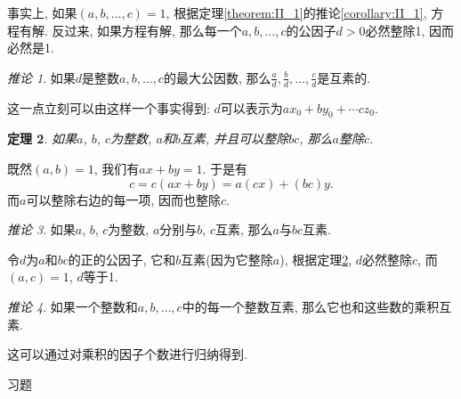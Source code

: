 \documentclass[12pt,a4paper]{book} %
\newtheorem{theorem}{定理}
\theoremstyle{remark}
\theoremstyle{example}
\theoremstyle{lemma}
\theoremstyle{corollary}
\newtheorem{corollary}[theorem]{推论}
\numberwithin{theorem}{chapter}
\begin{document}
事实上, 如果$(a, b, \ldots, c) = 1$, 根据定理\ref{theorem:II_1}的推论\ref{corollary:II_1}, 方程有解. 反过来, 如果方程有解, 那么每一个$a, b, \ldots, c$的公因子$d > 0$必然整除1, 因而必然是1.

\begin{corollary}
如果$d$是整数$a, b, \ldots, c$的最大公因数, 那么$\frac{a}{d}, \frac{b}{d}, \ldots, \frac{c}{d}$是互素的.
\end{corollary}

这一点立刻可以由这样一个事实得到: $d$可以表示为$ax_0 + by_0 + \cdots cz_0$.

\begin{theorem} \label{theorem:III_2}
如果$a$, $b$, $c$为整数, $a$和$b$互素, 并且可以整除$bc$, 那么$a$整除$c$.
\end{theorem}

既然$(a, b) = 1$, 我们有$ax + by = 1$. 于是有
\[
c = c(ax + by) = a(cx) + (bc)y.
\]
而$a$可以整除右边的每一项, 因而也整除$c$.

\begin{corollary}
如果$a$, $b$, $c$为整数, $a$分别与$b$, $c$互素, 那么$a$与$bc$互素.
\end{corollary}

令$d$为$a$和$bc$的正的公因子, 它和$b$互素(因为它整除$a$), 根据定理\ref{theorem:III_2}, $d$必然整除$c$, 而$(a, c) = 1$, $d$等于1.

\begin{corollary} \label{corollary:III_2}
如果一个整数和$a, b, \ldots, c$中的每一个整数互素, 那么它也和这些数的乘积互素.
\end{corollary}

这可以通过对乘积的因子个数进行归纳得到.

习题
\end{document}
